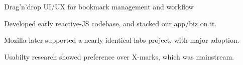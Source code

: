 \documentclass[letterpaper]{deedy-resume} %
\begin{document}
\begin{minipage}[t]{0.66\textwidth}
\sectionspace %




\vspace{\topsep} %
Drag'n'drop UI/UX for bookmark management and workflow
\begin{tightitemize}
\item Developed early reactive-JS codebase, and stacked our app/biz on it.
\item Mozilla later supported a nearly identical labs project, with major adoption.
\item Usabilty research showed preference over X-marks, which was mainstream.
\end{tightitemize}

\sectionspace %

\end{minipage} %


\newpage %
\end{document}

